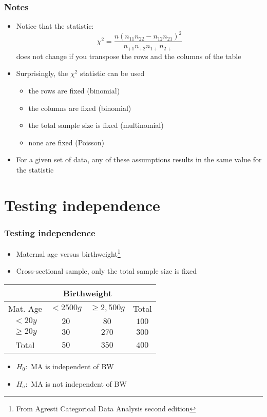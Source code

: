 \documentclass[aspectratio=169]{beamer}
\begin{document}
\begin{frame}\frametitle{Notes}
\begin{itemize}
\item Notice that the statistic:
$$
\chi^2 = \frac{n(n_{11} n_{22} - n_{12}n_{21})^2}{n_{+1} n_{+2} n_{1+} n_{2+}}
$$
does not change if you transpose the rows and the columns of the table
\item Surprisingly, the $\chi^2$ statistic can be used 
  \begin{itemize}
  \item the rows are fixed (binomial)
  \item the columns are fixed (binomial)
  \item the total sample size is fixed (multinomial)
  \item none are fixed (Poisson) 
  \end{itemize}
\item For a given set of data, any of these assumptions results
  in the same value for the statistic
\end{itemize}
\end{frame}

\section{Testing independence}
\begin{frame}\frametitle{Testing independence}
\begin{itemize}
\item Maternal age versus birthweight\footnote{From Agresti Categorical Data Analysis second edition}
\item Cross-sectional sample, only the total sample size is fixed
\end{itemize}
\begin{center}
\begin{tabular}{|c|c|c|c|} \hline
          & \multicolumn{2}{c}{Birthweight} & \\ \hline
Mat. Age  & $<2500g$ & $\geq 2,500g$ & Total \\ \hline
$< 20 y$    & $20$   & $80$  & $100$ \\   
$\geq 20 y$ & $30$   & $270$ & $300$ \\   \hline
Total       & $50$   & $350$ & $400$ \\   \hline
\end{tabular}
\end{center}
\begin{itemize}
\item $H_0:$ MA is independent of BW
\item $H_a:$ MA is not independent of BW
\end{itemize}
\end{frame}
\end{document}
